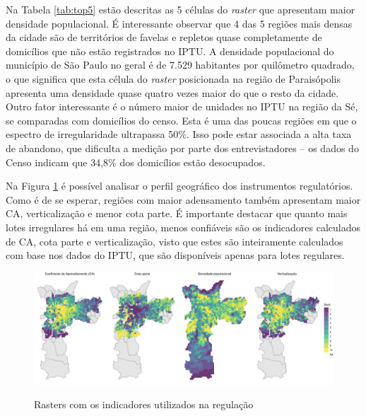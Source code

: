 \begin{table}[h]
    
\end{table}

Na Tabela \ref{tab:top5} estão descritas as 5 células do \textit{raster} que apresentam maior densidade populacional. É interessante observar que 4 das 5 regiões mais densas da cidade são de territórios de favelas e repletos quase completamente de domicílios que não estão registrados no IPTU. A densidade populacional do município de São Paulo no geral é de 7.529 habitantes por quilômetro quadrado, o que significa que esta célula do \textit{raster} posicionada na região de Paraisópolis apresenta uma densidade quase quatro vezes maior do que o resto da cidade. Outro fator interessante é o número maior de unidades no IPTU na região da Sé, se comparadas com domicílios do censo. Esta é uma das poucas regiões em que o espectro de irregularidade ultrapassa 50\%. Isso pode estar associada a alta taxa de abandono, que dificulta a medição por parte dos entrevistadores -- os dados do Censo indicam que 34,8\% dos domicílios estão desocupados.


Na Figura \ref{fig:rasters} é possível analisar o perfil geográfico dos instrumentos regulatórios. Como é de se esperar, regiões com maior adensamento também apresentam maior CA, verticalização e menor cota parte. É importante destacar que quanto mais lotes irregulares há em uma região, menos confiáveis são os indicadores calculados de CA, cota parte e verticalização, visto que estes são inteiramente calculados com base nos dados do IPTU, que são disponíveis apenas para lotes regulares.

\begin{figure}[h]
    \centering
    \caption{Rasters com os indicadores utilizados na regulação}
    \includegraphics[width = \linewidth]{imagens/rasters_wide.pdf}
    \label{fig:rasters}
\end{figure}

